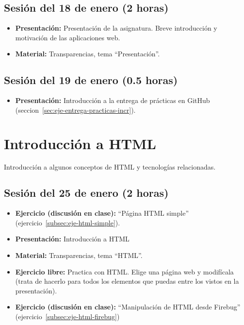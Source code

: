 \documentclass[a4paper,12pt]{report}
\begin{document}
\subsection{Sesión del 18 de enero (2 horas)}

\begin{itemize}
\item \textbf{Presentación:} Presentación de la asignatura. Breve introducción y motivación de las aplicaciones web.
\item \textbf{Material:} Transparencias, tema ``Presentación''.
\end{itemize}

\subsection{Sesión del 19 de enero (0.5 horas)}

\begin{itemize}
\item \textbf{Presentación:} Introducción a la entrega de prácticas en GitHub (seccion~\ref{sec:eje-entrega-practicas-incr}).
\end{itemize}

\section{Introducción a HTML}

Introducción a algunos conceptos de HTML y tecnologías relacionadas.

\subsection{Sesión del 25 de enero (2 horas)}

\begin{itemize}
\item \textbf{Ejercicio (discusión en clase):} ``Página HTML simple'' (ejercicio~\ref{subsec:eje-html-simple}).
\item \textbf{Presentación:} Introducción a HTML
\item \textbf{Material:} Transparencias, tema ``HTML''.
\item \textbf{Ejercicio libre:} Practica con HTML. Elige una página web y modifícala (trata de hacerlo para todos los elementos que puedas entre los vistos en la presentación).
\item \textbf{Ejercicio (discusión en clase):} ``Manipulación de HTML desde Firebug'' (ejercicio~\ref{subsec:eje-html-firebug})
\end{itemize}
\end{document}
